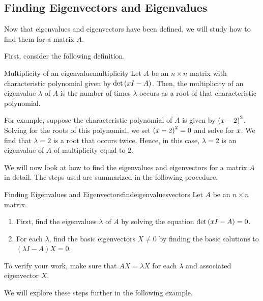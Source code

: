 \subsection{Finding Eigenvectors and Eigenvalues}

Now that eigenvalues and eigenvectors have been defined, we will study how to find
 them for a matrix $A$. 

First, consider the following definition.

\begin{definition}{Multiplicity of an eigenvalue}{multiplicity}
Let $A$ be an $n \times n$ matrix with characteristic polynomial given by 
$\det \left( x I -  A\right)$. Then, the multiplicity of an eigenvalue $\lambda$ of $A$
is the number of times $\lambda$ occurs as a root of that characteristic polynomial.
\end{definition}

For example, suppose the characteristic polynomial of $A$ is given by
$\left( x - 2 \right)^2$. Solving for the roots of this
polynomial, we set $\left( x - 2 \right)^2 = 0$ and solve for
$x$.  We find that $\lambda = 2$ is a root that occurs
twice. Hence, in this case, $\lambda = 2$ is an eigenvalue of $A$ of
multiplicity equal to $2$.

We will now look at how to find the eigenvalues and eigenvectors for a
matrix $A$ in detail.  The steps used are summarized in the following
procedure.

\begin{procedure}{Finding Eigenvalues and Eigenvectors}{findeigenvaluesvectors}
%
Let $A$ be an $n \times n$ matrix. 
\begin{enumerate}
\item First, find the eigenvalues $\lambda$ of $A$ by solving the equation $\det \left( x I -A \right) = 0$. 

\item For each $\lambda$, find the basic eigenvectors $X \neq 0$ by finding the basic solutions to  $\left( \lambda I - A \right) X = 0$.
\end{enumerate}

To verify your work, make sure that $AX=\lambda X$
for each $\lambda$ and associated eigenvector $X$.
\end{procedure}

We will explore these steps further in the following example.

